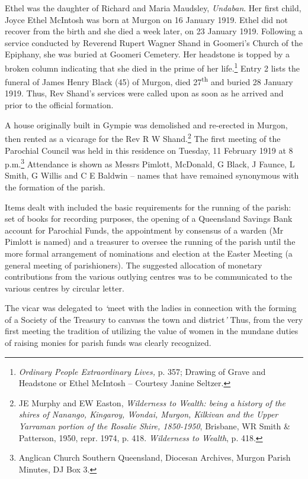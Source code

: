Ethel was the daughter of Richard and Maria Maudsley, \emph{Undaban}. Her first child, Joyce Ethel McIntosh was born at Murgon on 16 January 1919. Ethel did not recover from the birth and she died a week later, on 23 January 1919. Following a service conducted by Reverend Rupert Wagner Shand in Goomeri's Church of the Epiphany, she was buried at Goomeri Cemetery. Her headstone is topped by a broken column indicating that she died in the prime of her life.\footnote{\emph{Ordinary People Extraordinary Lives,} p. 357; Drawing of Grave and Headstone or Ethel McIntosh -- Courtesy Janine Seltzer.} Entry 2 lists the funeral of James Henry Black (45) of Murgon, died 27\textsuperscript{th} and buried 28 January 1919. Thus, Rev Shand's services were called upon as soon as he arrived and prior to the official formation.


A house originally built in Gympie was demolished and re-erected in Murgon, then rented as a vicarage for the Rev R W Shand.\footnote{JE Murphy and EW Easton, \emph{Wilderness to Wealth: being a history of the shires of Nanango, Kingaroy, Wondai, Murgon, Kilkivan and the Upper Yarraman portion of the Rosalie Shire, 1850-1950}, Brisbane, WR Smith \& Patterson, 1950, repr. 1974, p. 418. \emph{Wilderness to Wealth}, p. 418.} The first meeting of the Parochial Council was held in this residence on Tuesday, 11 February 1919 at 8 p.m.\footnote{Anglican Church Southern Queensland, Diocesan Archives, Murgon Parish Minutes, DJ Box 3.} Attendance is shown as Messrs Pimlott, McDonald, G Black, J Faunce, L Smith, G Willis and C E Baldwin -- names that have remained synonymous with the formation of the parish.


Items dealt with included the basic requirements for the running of the parish: set of books for recording purposes, the opening of a Queensland Savings Bank account for Parochial Funds, the appointment by consensus of a warden (Mr Pimlott is named) and a treasurer to oversee the running of the parish until the more formal arrangement of nominations and election at the Easter Meeting (a general meeting of parishioners). The suggested allocation of monetary contributions from the various outlying centres was to be communicated to the various centres by circular letter.



The vicar was delegated to \emph{`}meet with the ladies in connection with the forming of a Society of the Treasury to canvass the town and district\emph{'} Thus, from the very first meeting the tradition of utilizing the value of women in the mundane duties of raising monies for parish funds was clearly recognized.



